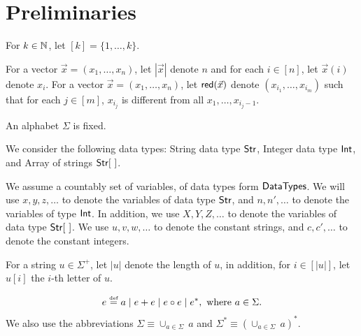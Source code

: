 \documentclass{llncs}
\begin{document}
\section{Preliminaries}

For $k \in \mathbb{N}$, let $[k] = \{1,\dots, k\}$.

For a vector $\vec{x}=(x_1,\dots, x_n)$, let $|\vec{x}|$ denote $n$ and for each $i \in [n]$, let $\vec{x}(i)$ denote $x_i$. For a vector $\vec{x} = (x_1, \dots, x_n)$, let $\mathsf{red}(\vec{x})$ denote $(x_{i_1},\dots, x_{i_m})$ such that for each $j \in [m]$, $x_{i_j}$ is different from all $x_1, \dots, x_{i_j-1}$.

An alphabet $\Sigma$ is fixed.

We consider the following data types: String data type ${\sf Str}$, Integer data type ${\sf Int}$, and Array of strings $\str [\ ]$.


We assume a countably set of variables, of data types form ${\sf DataTypes}$. We will use $x, y, z, \dots$ to denote the variables of data type ${\sf Str}$, and $n, n', \dots$ to denote the variables of type ${\sf Int}$. In addition, we use $X, Y, Z, \dots$ to denote the variables of data type $\str[\ ]$.
We use $u, v, w, \dots$ to denote the constant strings, and $c, c',\dots$ to denote the constant integers.


For a string $u \in \Sigma^+$, let $|u|$ denote the length of $u$, in addition, for $i \in [|u|]$, let $u[i]$ the $i$-th letter of $u$.

\begin{definition}
\[e \eqdef a \mid e + e \mid e \concat e \mid e^\ast, \mbox{ where } a \in \Sigma. \]
We also use the abbreviations $\Sigma \equiv \cup_{a \in \Sigma}\ a$ and $\Sigma^\ast \equiv (\cup_{a \in \Sigma}\ a)^\ast$.
\end{definition}

\end{document}
